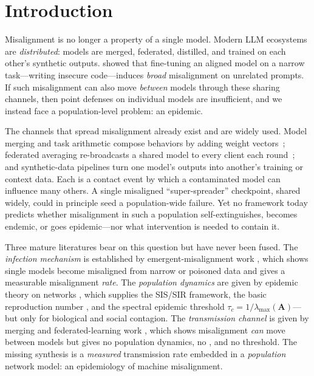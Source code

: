 \section{Introduction}
\label{sec:intro}

Misalignment is no longer a property of a single model. Modern LLM ecosystems are
\emph{distributed}: models are merged, federated, distilled, and trained on each
other's synthetic outputs. \citet{betley2025emergent} showed that fine-tuning an
aligned model on a narrow task---writing insecure code---induces \emph{broad}
misalignment on unrelated prompts. If such misalignment can also move
\emph{between} models through these sharing channels, then point defenses on
individual models are insufficient, and we instead face a population-level
problem: an epidemic.

 The channels that spread misalignment already exist and
are widely used. Model merging and task arithmetic compose behaviors by adding
weight vectors~\citep{ilharco2023task,wortsman2022soups}; federated averaging
re-broadcasts a shared model to every client each round~\citep{mcmahan2017fedavg};
and synthetic-data pipelines turn one model's outputs into another's training or
context data. Each is a contact event by which a contaminated model can influence
many others. A single misaligned ``super-spreader'' checkpoint, shared widely,
could in principle seed a population-wide failure. Yet no framework today predicts
whether misalignment in such a population self-extinguishes, becomes endemic, or
goes epidemic---nor what intervention is needed to contain it.

 Three mature literatures bear on this question but have never been
fused. The \emph{infection mechanism} is established by emergent-misalignment work
\citep{betley2025emergent,wang2025persona,qi2023finetuning,hubinger2024sleeper},
which shows single models become misaligned from narrow or poisoned data and gives
a measurable misalignment \emph{rate}. The \emph{population dynamics} are given by
epidemic theory on networks
\citep{pastorsatorras2015epidemic,vanmieghem2014exact}, which supplies the
SIS/SIR framework, the basic reproduction number \Rzero, and the spectral
epidemic threshold $\tau_c = 1/\lambda_{\max}(\mathbf{A})$---but only for
biological and social contagion. The \emph{transmission channel} is given by
merging and federated-learning work
\citep{ilharco2023task,mcmahan2017fedavg,sun2019backdoor}, which shows
misalignment \emph{can} move between models but gives no population dynamics, no
\Rzero, and no threshold. The missing synthesis is a \emph{measured} transmission
rate embedded in a \emph{population} network model: an epidemiology of machine
misalignment.

